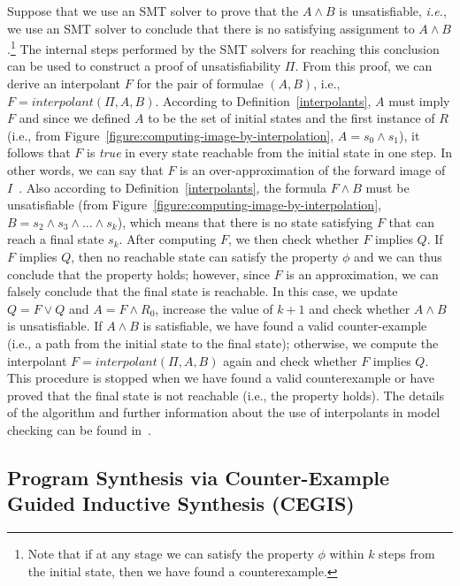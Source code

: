 \documentclass[format=acmsmall, review=false, screen=true]{acmart}
\begin{document}
Suppose that we use an SMT solver to prove that the $A \wedge B$ is unsatisfiable, {\it i.e.}, we use an SMT solver to conclude that there is no satisfying assignment to $A \wedge B$.\footnote{Note that if at any stage we can satisfy the property $\phi$ within $k$ steps from the initial state, then we have found a counterexample.} The internal steps performed by the SMT solvers for reaching this conclusion can be used to construct a proof of unsatisfiability $\Pi$. From this proof, we can derive an interpolant $F$ for the pair of formulae $\left(A,B\right)$, i.e., $F = interpolant\left(\Pi, A, B\right)$. According to Definition~\ref{interpolants}, $A$ must imply $F$ and since we defined $A$ to be the set of initial states and the first instance of $R$ (i.e., from Figure~\ref{figure:computing-image-by-interpolation}, $A=s_{0} \wedge s_{1}$), it follows that $F$ is \textit{true} in every state reachable from the initial state in one step. In other words, we can say that $F$ is an over-approximation of the forward image of $I$~\cite{McMillan03,McMillan05}. Also according to Definition~\ref{interpolants}, the formula $F \wedge B$ must be unsatisfiable (from Figure~\ref{figure:computing-image-by-interpolation}, $B=s_{2} \wedge s_{3} \wedge \ldots \wedge s_{k}$), which means that there is no state satisfying $F$ that can reach a final state $s_k$. After computing $F$, we then check whether $F$ implies $Q$. If $F$ implies $Q$, then no reachable state can satisfy the property $\phi$ and we can thus conclude that the property holds; however, since $F$ is an approximation, we can falsely conclude that the final state is reachable. In this case, we update $Q = F \vee Q$ and $A = F \wedge R_{0}$, increase the value of $k+1$ and check whether $A \wedge B$ is unsatisfiable. If $A \wedge B$ is satisfiable, we have found a valid counter-example (i.e., a path from the initial state to the final state); otherwise, we compute the interpolant $F = interpolant\left(\Pi, A, B\right)$ again and check whether $F$ implies $Q$. This procedure is stopped when we have found a valid counterexample or have proved that the final state is not reachable (i.e., the property holds). The details of the algorithm and further information about the use of interpolants in model checking can be found in~\cite{McMillan03,McMillan05,McMillan06,McMillan07}. 

\subsection{Program Synthesis via Counter-Example \\ Guided Inductive Synthesis (CEGIS)}
\end{document}
